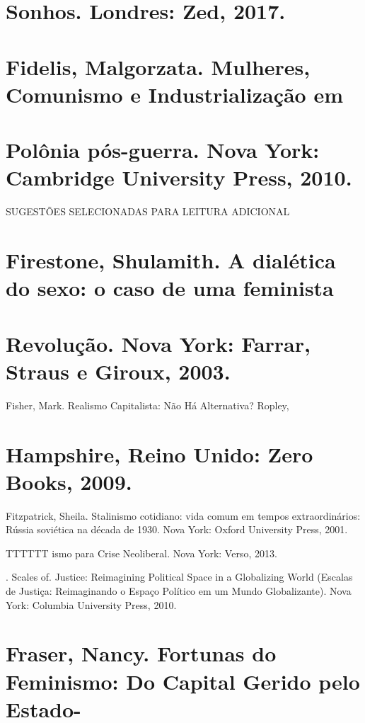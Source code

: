 \section{Sonhos. Londres: Zed, 2017.}
 \par 
\section{Fidelis, Malgorzata. Mulheres, Comunismo e Industrialização em}
 \par 
\section{Polônia pós-guerra. Nova York: Cambridge University Press, 2010.}
 \par 
SUGESTÕES SELECIONADAS PARA LEITURA ADICIONAL
 \par 
\section{Firestone, Shulamith. A dialética do sexo: o caso de uma feminista}
 \par 
\section{Revolução. Nova York: Farrar, Straus e Giroux, 2003.}
 \par 
Fisher, Mark. Realismo Capitalista: Não Há Alternativa? Ropley,
 \par 
\section{Hampshire, Reino Unido: Zero Books, 2009.}
 \par 
Fitzpatrick, Sheila. Stalinismo cotidiano: vida comum em tempos extraordinários: Rússia soviética na década de 1930. Nova York: Oxford University Press, 2001.
 \par 
TTTTTT ismo para Crise Neoliberal. Nova York: Verso, 2013.
 \par 
. Scales of. Justice: Reimagining Political Space in a Globalizing World (Escalas de Justiça: Reimaginando o Espaço Político em um Mundo Globalizante). Nova York: Columbia University Press, 2010.
 \par 
\section{Fraser, Nancy. Fortunas do Feminismo: Do ​​Capital Gerido pelo Estado-}
 \par 
